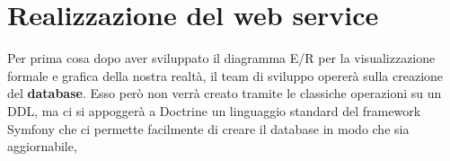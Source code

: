 \section{Realizzazione del web service}
Per prima cosa dopo aver sviluppato il diagramma E/R per la visualizzazione formale e grafica della nostra realtà, il team di sviluppo opererà sulla creazione del \textbf{database}.
Esso però non verrà creato tramite le classiche operazioni su un DDL, ma ci si appoggerà a Doctrine un linguaggio standard del framework Symfony che ci permette facilmente di creare il database in modo che sia aggiornabile, 